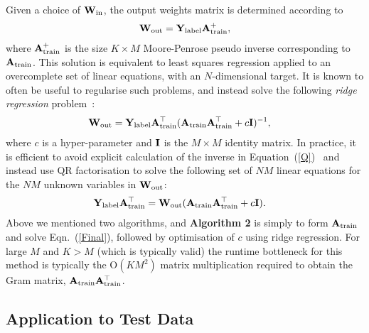 \documentclass[conference]{IEEEtran}
\begin{document}
Given a choice of ${\bf W}_{\rm in}$, the output weights matrix is determined according to
\begin{align}\label{T2}
{\bf W}_{\rm out} = {\bf Y}_{\rm label}{\bf A}_{\rm train}^+,
\end{align}
where ${\bf A}_{\rm train}^+$ is the size $K\times M$ Moore-Penrose pseudo inverse corresponding to ${\bf A}_{\rm train}$. This solution is equivalent to least squares regression applied to an overcomplete set of linear equations, with an $N$-dimensional target.  It is known to often be useful to regularise such problems, and instead solve the following {\em ridge regression} problem~\cite{Huang.12,Huang.14}:
\begin{align}\label{Q}
{\bf W}_{\rm out} &= {\bf Y}_{\rm label}{\bf A}_{\rm train}^{\top}({\bf A}_{\rm train}{\bf A}_{\rm train}^{\top}+c{\bf I})^{-1},
\end{align}
where $c$ is a hyper-parameter and ${\bf I}$ is the $M\times M$ identity matrix. In practice, it is efficient to avoid explicit calculation of the inverse in Equation~(\ref{Q})~\cite{McDonnell.15PLOS} and instead use QR factorisation to solve the following set of $NM$ linear equations for the $NM$ unknown variables in ${\bf W}_{\rm out}$:
\begin{align}\label{Final}
{\bf Y}_{\rm label}{\bf A}_{\rm train}^{\top} &= {\bf W}_{\rm out}({\bf A}_{\rm train}{\bf A}_{\rm train}^{\top}+c{\bf I}).
\end{align}
Above we mentioned two algorithms, and {\bf Algorithm 2} is simply to form ${\bf A}_{\rm train}$ and solve Eqn.~(\ref{Final}), followed by optimisation of $c$ using ridge regression. For large $M$ and $K>M$ (which is typically valid) the runtime bottleneck for this method is typically the O$(KM^2)$ matrix multiplication required to obtain the Gram matrix, ${\bf A}_{\rm train}{\bf A}_{\rm train}^{\top}$.

\subsection{Application to Test Data}
\end{document}
